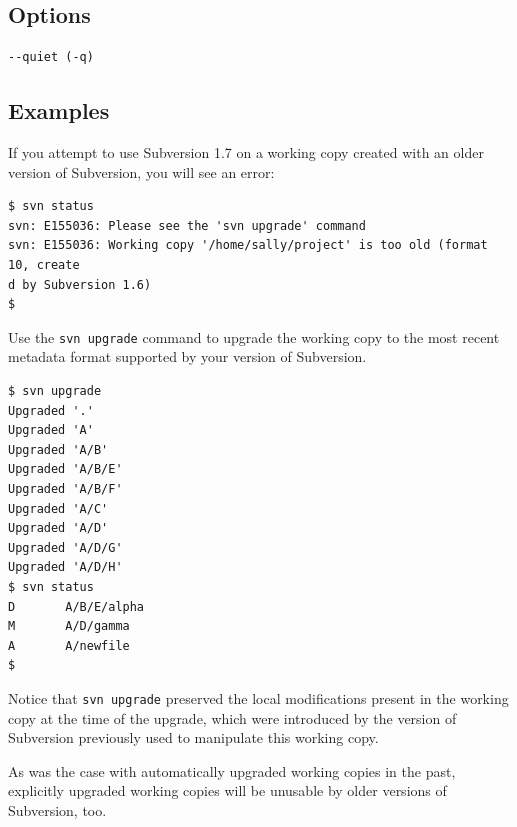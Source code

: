 \subsection{Options}

\begin{verbatim}
--quiet (-q)
\end{verbatim}

\subsection{Examples}

If you attempt to use Subversion 1.7 on a working copy created with an
older version of Subversion, you will see an error:

\begin{verbatim}
$ svn status
svn: E155036: Please see the 'svn upgrade' command
svn: E155036: Working copy '/home/sally/project' is too old (format 10, create
d by Subversion 1.6)
$
\end{verbatim}

Use the \texttt{svn\ upgrade} command to upgrade the working copy to the
most recent metadata format supported by your version of Subversion.

\begin{verbatim}
$ svn upgrade
Upgraded '.'
Upgraded 'A'
Upgraded 'A/B'
Upgraded 'A/B/E'
Upgraded 'A/B/F'
Upgraded 'A/C'
Upgraded 'A/D'
Upgraded 'A/D/G'
Upgraded 'A/D/H'
$ svn status
D       A/B/E/alpha
M       A/D/gamma
A       A/newfile
$
\end{verbatim}

Notice that \texttt{svn\ upgrade} preserved the local modifications
present in the working copy at the time of the upgrade, which were
introduced by the version of Subversion previously used to manipulate
this working copy.

As was the case with automatically upgraded working copies in the past,
explicitly upgraded working copies will be unusable by older versions of
Subversion, too.

